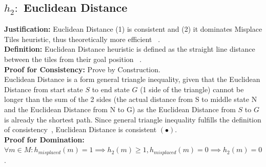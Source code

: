 \documentclass[runningheads]{llncs}
\begin{document}
\subsection{\(h_2:\) Euclidean Distance}
\textbf{Justification:} Euclidean Distance (1) is consistent and (2) it dominates Misplace Tiles heuristic, thus theoretically more efficient ~\cite[104]{stuart_russell_artifical_2010}. \\
\textbf{Definition:} Euclidean Distance heuristic is defined as the straight line distance between the tiles from their goal position ~\cite{rosalind_euclidean_nodate}. \\
\textbf{Proof for Consistency:} Prove by Construction. \\
Euclidean Distance is a form general triangle inequality, given that the Euclidean Distance from start state \( S \) to end state \( G \) (1 side of the triangle) cannot be longer than the sum of the 2 sides (the actual distance from S to middle state N and the Euclidean Distance from N to G) as the Euclidean Distance from \( S \) to \( G \) is already the shortest path. 
Since general triangle inequality fulfills the definition of consistency~\cite[p95]{stuart_russell_artifical_2010}, Euclidean Distance is consistent \( (\bullet) \). \\
\textbf{Proof for Domination:} \( \forall m \in M: h_{misplaced}(m) = 1 \implies h_{2}(m) \geq 1, h_{misplaced}(m) = 0 \implies h_{2}(m) = 0 \).
\end{document}
